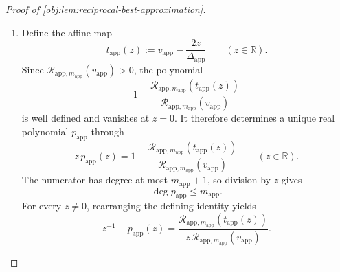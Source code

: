 \begin{proof}[Proof of \cref{obj:lem:reciprocal-best-approximation}]
\begin{enumerate}
\item Define the affine map
\[
t_{\mathrm{app}}(z):=
v_{\mathrm{app}}-\frac{2z}{\Delta_{\mathrm{app}}}
\qquad(z\in\mathbb R).
\]
Since \(\mathcal R_{\mathrm{app},m_{\mathrm{app}}}
(v_{\mathrm{app}})>0\), the polynomial
\[
1-
\frac{\mathcal R_{\mathrm{app},m_{\mathrm{app}}}
(t_{\mathrm{app}}(z))}
{\mathcal R_{\mathrm{app},m_{\mathrm{app}}}(v_{\mathrm{app}})}
\]
is well defined and vanishes at \(z=0\). It therefore determines a unique real polynomial \(p_{\mathrm{app}}\) through
\[
z\,p_{\mathrm{app}}(z)
=
1-
\frac{\mathcal R_{\mathrm{app},m_{\mathrm{app}}}
(t_{\mathrm{app}}(z))}
{\mathcal R_{\mathrm{app},m_{\mathrm{app}}}(v_{\mathrm{app}})}
\qquad(z\in\mathbb R).
\]
The numerator has degree at most \(m_{\mathrm{app}}+1\), so division by \(z\) gives
\[
\deg p_{\mathrm{app}}\le m_{\mathrm{app}}.
\]
For every \(z\ne0\), rearranging the defining identity yields
\[
z^{-1}-p_{\mathrm{app}}(z)
=
\frac{\mathcal R_{\mathrm{app},m_{\mathrm{app}}}
(t_{\mathrm{app}}(z))}
{z\,\mathcal R_{\mathrm{app},m_{\mathrm{app}}}
(v_{\mathrm{app}})}.
\]


\end{enumerate}
\end{proof}

